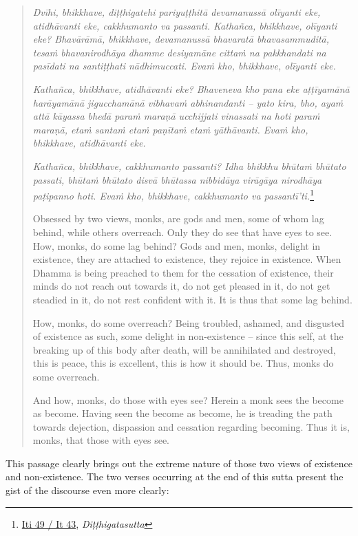 \enlargethispage{2\baselineskip}

\begin{quote}
\emph{Dvīhi, bhikkhave, diṭṭhigatehi pariyuṭṭhitā devamanussā olīyanti eke, atidhāvanti eke, cakkhumanto va passanti. Kathañca, bhikkhave, olīyanti eke? Bhavārāmā, bhikkhave, devamanussā bhavaratā bhavasammuditā, tesaṁ bhavanirodhāya dhamme desiyamāne cittaṁ na pakkhandati na pasīdati na santiṭṭhati nādhimuccati. Evaṁ kho, bhikkhave, olīyanti eke.}

\emph{Kathañca, bhikkhave, atidhāvanti eke? Bhaveneva kho pana eke aṭṭīyamānā harāyamānā jigucchamānā vibhavaṁ abhinandanti -- yato kira, bho, ayaṁ attā kāyassa bhedā paraṁ maraṇā ucchijjati vinassati na hoti paraṁ maraṇā, etaṁ santaṁ etaṁ paṇītaṁ etaṁ yāthāvanti. Evaṁ kho, bhikkhave, atidhāvanti eke.}

\emph{Kathañca, bhikkhave, cakkhumanto passanti? Idha bhikkhu bhūtaṁ bhūtato passati, bhūtaṁ bhūtato disvā bhūtassa nibbidāya virāgāya nirodhāya paṭipanno hoti. Evaṁ kho, bhikkhave, cakkhumanto va passantī'ti.}\footnote{\href{https://suttacentral.net/iti49/pli/ms}{Iti 49 / It 43}, \emph{Diṭṭhigatasutta}}

Obsessed by two views, monks, are gods and men, some of whom lag behind, while others overreach. Only they do see that have eyes to see. How, monks, do some lag behind? Gods and men, monks, delight in existence, they are attached to existence, they rejoice in existence. When Dhamma is being preached to them for the cessation of existence, their minds do not reach out towards it, do not get pleased in it, do not get steadied in it, do not rest confident with it. It is thus that some lag behind.

How, monks, do some overreach? Being troubled, ashamed, and disgusted of existence as such, some delight in non-existence -- since this self, at the breaking up of this body after death, will be annihilated and destroyed, this is peace, this is excellent, this is how it should be. Thus, monks do some overreach.

And how, monks, do those with eyes see? Herein a monk sees the become as become. Having seen the become as become, he is treading the path towards dejection, dispassion and cessation regarding becoming. Thus it is, monks, that those with eyes see.
\end{quote}

This passage clearly brings out the extreme nature of those two views of existence and non-existence. The two verses occurring at the end of this sutta present the gist of the discourse even more clearly:

